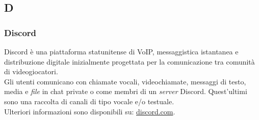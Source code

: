\subsection{D}
\subsubsection{Discord}
Discord è una piattaforma statunitense di VoIP, messaggistica istantanea e
distribuzione digitale inizialmente progettata per la comunicazione tra comunità
di videogiocatori.\\
Gli utenti comunicano con chiamate vocali, videochiamate, messaggi di testo,
media e \textit{file} in chat private o come membri di un \textit{server}
Discord. Quest'ultimi sono una raccolta di canali di tipo vocale e/o testuale.\\
Ulteriori informazioni sono disponibili su:
\href{https://discord.com/}{discord.com}.

\newpage
